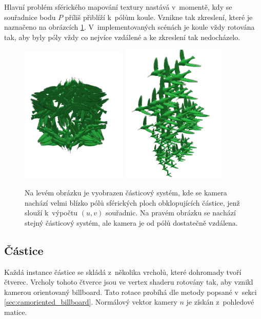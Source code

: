 Hlavní problém sférického mapování textury nastává v~momentě, kdy se souřadnice bodu $P$ příliš přiblíží k~pólům koule. Vznikne tak zkreslení, které je naznačeno na obrázcích \ref{fig:lf_baduv_mapping}. V~implementovaných scénách je koule vždy rotována tak, aby byly póly vždy co nejvíce vzdálené a ke zkreslení tak nedocházelo. 
\begin{figure}[H]
	\centering
	\includegraphics[width=0.45\textwidth]{obrazky-figures/uv_bad.png}
	\includegraphics[width=0.45\textwidth]{obrazky-figures/uv_gut.png}
	\caption{Na levém obrázku je vyobrazen částicový systém, kde se kamera nachází velmi blízko pólů sférických ploch obklopujících částice, jenž slouží k~výpočtu $(u,v)$ souřadnic. Na pravém obrázku se nachází stejný částicový systém, ale kamera je od pólů dostatečně vzdálena.  }
	\label{fig:lf_baduv_mapping}
\end{figure}

\subsection{Částice}
Každá instance částice se skládá z~několika vrcholů, které dohromady tvoří čtverec. Vrcholy tohoto čtverce jsou ve vertex shaderu rotovány tak, aby vznikl kamerou orientovaný billboard. Tato rotace probíhá dle metody popsané v~sekci \ref{sec:camoriented_billboard}. Normálový vektor kamery $n$ je získán z~pohledové matice. 

